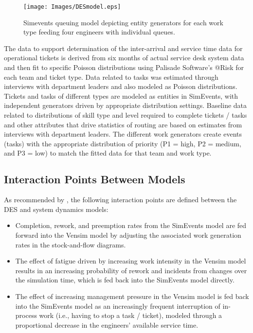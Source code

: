 \documentclass[conference]{IEEEtran}
\begin{document}
\begin{figure}[t]
\centering
\texttt{[image: Images/DESmodel.eps]}
\caption{Simevents queuing model depicting entity generators for each work type feeding four engineers with individual queues.}
\label{fig:DESmodel}
\end{figure}

The data to support determination of the inter-arrival and service time data for operational tickets is derived from six months of actual service desk system data and then fit to specific Poisson distributions using Palisade Software's @Risk for each team and ticket type. Data related to tasks was estimated through interviews with department leaders and also modeled as Poisson distributions. Tickets and tasks of different types are modeled as entities in SimEvents, with independent generators driven by appropriate distribution settings. Baseline data related to distributions of skill type and level required to complete tickets / tasks and other attributes that drive statistics of routing are based on estimates from interviews with department leaders. The different work generators create events (tasks) with the appropriate distribution of priority (P1 = high, P2 = medium, and P3 = low) to match the fitted data for that team and work type.

\subsection{Interaction Points Between Models}

As recommended by \cite{greasley_simulating_2019}, the following interaction points are defined between the DES and system dynamics models:

\begin{itemize}
\item Completion, rework, and preemption rates from the SimEvents model are fed forward into the Vensim model by adjusting the associated work generation rates in the stock-and-flow diagrams.
\item The effect of fatigue driven by increasing work intensity in the Vensim model results in an increasing probability of rework and incidents from changes over the simulation time, which is fed back into the SimEvents model directly.
\item The effect of increasing management pressure in the Vensim model is fed back into the SimEvents model as an increasingly frequent interruption of in-process work (i.e., having to stop a task / ticket), modeled through a proportional decrease in the engineers' available service time.
\end{itemize}
\end{document}
